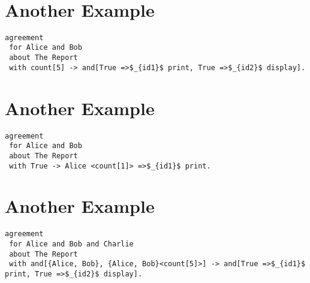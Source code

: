 \begin{minipage}[c]{0.95\textwidth}
\begin{lstlisting}


\end{lstlisting}
\end{minipage} 














\section {Another Example}
\lstset{language=Pucella2006}
\begin{minipage}[c]{0.95\textwidth}
\begin{lstlisting}[frame=single, caption={Agreement of Example 2.2}, label={lst:pucellatwotwoexampleAST}, mathescape]
agreement
 for Alice and Bob 
 about The Report 
 with count[5] -> and[True =>$_{id1}$ print, True =>$_{id2}$ display].
\end{lstlisting}
\end{minipage} 
%
\section {Another Example}
\lstset{language=Pucella2006}
\begin{minipage}[c]{0.95\textwidth}
\begin{lstlisting}[frame=single, caption={Agreement of Example 2.3}, label={lst:pucellatwothreeexampleAST}, mathescape]
agreement
 for Alice and Bob 
 about The Report 
 with True -> Alice <count[1]> =>$_{id1}$ print.
\end{lstlisting}
\end{minipage} 
%
\section {Another Example}
\lstset{language=Pucella2006}
\begin{minipage}[c]{0.95\textwidth}
\begin{lstlisting}[frame=single, caption={Agreement of Example 2.4}, label={lst:pucellatwofourexampleAST}, mathescape]
agreement
 for Alice and Bob and Charlie
 about The Report 
 with and[{Alice, Bob}, {Alice, Bob}<count[5]>] -> and[True =>$_{id1}$ print, True =>$_{id2}$ display].
\end{lstlisting}
\end{minipage} 
%

